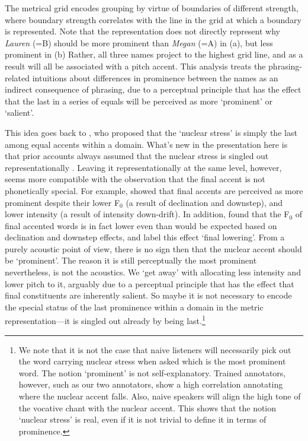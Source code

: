 \documentclass[preprint,review,12pt,authoryear,times]{elsarticle}
\begin{document}
\noindent The metrical grid encodes grouping by virtue of boundaries of different strength, where boundary strength correlates with the line in the grid at which a boundary is represented. Note that the representation does not directly represent why {\em Lauren} (=B) should be more prominent than {\em Megan} (=A)  in (a), but less  prominent in (b) Rather, all three names project to the highest grid line, and as a result will all be associated with a pitch accent. This analysis treats the phrasing-related intuitions about differences in prominence between the names as an indirect consequence of phrasing, due to a perceptual principle that has the effect that the last in a series of equals will be perceived as more `prominent' or `salient'. 

This idea goes back to \citet[][]{newma46}, who proposed that the `nuclear stress' is simply the last among equal accents within a domain. What's new in the presentation here is that prior accounts always assumed that the nuclear stress is singled out representationally \citep[e.g.][]{SPE, truck95}. Leaving it representationally at the same level, however, seems more compatible with the observation that the final accent is not phonetically special. For example, \citet{pierr79} showed that final accents are perceived as more prominent despite their lower F$_0$ (a result of declination and downstep), and lower  intensity (a result of intensity down-drift). In addition, \citet{liber84} found  that the F$_0$ of final accented words is in fact lower even than would be expected based on declination and downstep effects, and label this effect `final lowering'. From a purely acoustic point of view, there is no sign then that the nuclear accent should be  `prominent'. The reason it is still perceptually the most prominent nevertheless, is not the acoustics. We `get away' with allocating less intensity and lower pitch to it, arguably due to a perceptual principle that has the effect that final constituents are inherently salient. So maybe it is not necessary to encode the special status of the last prominence within a domain in the metric representation---it is singled out already by being last.\footnote{We note that it is not the case that naive listeners will necessarily pick out the word carrying nuclear stress when asked which is the most prominent word. The notion `prominent' is not self-explanatory. Trained annotators, however, such as our two annotators, show a high correlation annotating where the nuclear accent falls. Also, naive speakers will align the high tone of the vocative chant with the nuclear accent. This shows that the notion `nuclear stress' is real, even if it is not trivial to define it in terms of prominence.}   
\end{document}
